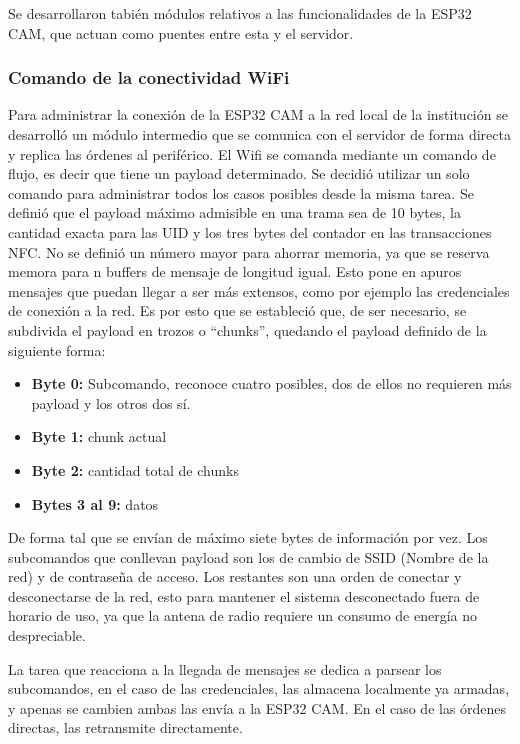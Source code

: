 Se desarrollaron tabién módulos relativos a las funcionalidades de la ESP32 CAM, que actuan como puentes entre esta y el servidor. 

\subsubsection{Comando de la conectividad WiFi}
Para administrar la conexión de la ESP32 CAM a la red local de la institución se desarrolló un módulo intermedio que se comunica con el servidor de forma directa y replica las órdenes al periférico.
El Wifi se comanda mediante un comando de flujo, es decir que tiene un payload determinado. Se decidió utilizar un solo comando para administrar todos los casos posibles desde la misma tarea.
Se definió que el payload máximo admisible en una trama sea de 10 bytes, la cantidad exacta para las UID y los tres bytes del contador en las transacciones NFC. No se definió un número mayor para ahorrar memoria, ya que se reserva memora para n buffers de mensaje de longitud igual. Esto pone en apuros mensajes que puedan llegar a ser más extensos, como por ejemplo las credenciales de conexión a la red. 
Es por esto que se estableció que, de ser necesario, se subdivida el payload en trozos o \enquote{chunks}, quedando el payload definido de la siguiente forma:

\begin{itemize}
	\item \textbf{Byte 0:} Subcomando, reconoce cuatro posibles, dos de ellos no requieren más payload y los otros dos sí.
	\item \textbf{Byte 1:} chunk actual
	\item \textbf{Byte 2:} cantidad total de chunks
	\item \textbf{Bytes 3 al 9:} datos
\end{itemize}

De forma tal que se envían de máximo siete bytes de información por vez.
Los subcomandos que conllevan payload son los de cambio de SSID (Nombre de la red) y de contraseña de acceso. Los restantes son una orden de conectar y desconectarse de la red, esto para mantener el sistema desconectado fuera de horario de uso, ya que la antena de radio requiere un consumo de energía no despreciable.

La tarea que reacciona a la llegada de mensajes se dedica a parsear los subcomandos, en el caso de las credenciales, las almacena localmente ya armadas, y apenas se cambien ambas las envía a la ESP32 CAM. En el caso de las órdenes directas, las retransmite directamente.


